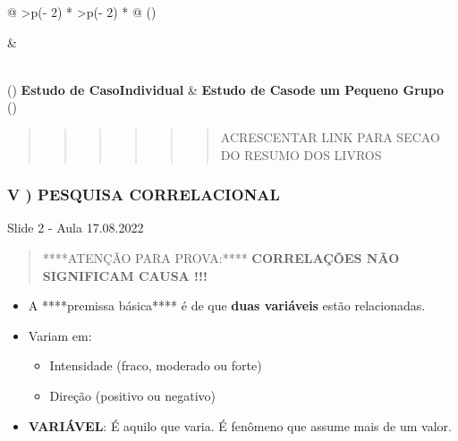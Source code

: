 \documentclass[
]{book}
\providecommand{\tightlist}{%
  \setlength{\itemsep}{0pt}\setlength{\parskip}{0pt}}
\begin{document}
\begin{longtable}[]{@{}
  >{\centering\arraybackslash}p{(\columnwidth - 2\tabcolsep) * }
  >{\centering\arraybackslash}p{(\columnwidth - 2\tabcolsep) * }@{}}
\toprule()
\begin{minipage}[b]{\linewidth}\centering
\end{minipage} & \begin{minipage}[b]{\linewidth}\centering
\end{minipage} \\
\midrule()
\endhead
\textbf{Estudo de CasoIndividual} & \textbf{Estudo de Casode um Pequeno Grupo} \\
\bottomrule()
\end{longtable}

\begin{quote}
\begin{quote}
\begin{quote}
\begin{quote}
\begin{quote}
\begin{quote}
ACRESCENTAR LINK PARA SECAO DO RESUMO DOS LIVROS
\end{quote}
\end{quote}
\end{quote}
\end{quote}
\end{quote}
\end{quote}

\hypertarget{v-pesquisa-correlacional-1}{%
\subsubsection{V ) PESQUISA CORRELACIONAL}\label{v-pesquisa-correlacional-1}}

Slide 2 - Aula 17.08.2022

\begin{quote}
****ATENÇÃO PARA PROVA:**** \textbf{CORRELAÇÕES NÃO SIGNIFICAM CAUSA !!!}
\end{quote}

\begin{itemize}
\tightlist
\item
  A ****premissa básica**** é de que \textbf{duas variáveis} estão relacionadas.
\item
  Variam em:

  \begin{itemize}
  \tightlist
  \item
    Intensidade (fraco, moderado ou forte)
  \item
    Direção (positivo ou negativo)
  \end{itemize}
\item
  \textbf{VARIÁVEL}: É aquilo que varia. É fenômeno que assume mais de um valor.
\end{itemize}
\end{document}
